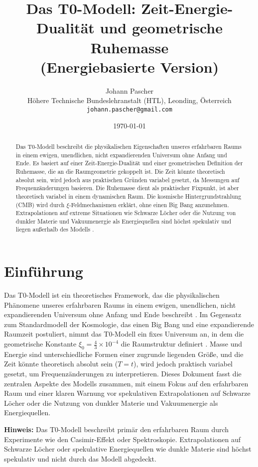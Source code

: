 \documentclass[12pt,a4paper]{article}
\title{Das T0-Modell: Zeit-Energie-Dualität und geometrische Ruhemasse\\
	\large (Energiebasierte Version)}
\author{Johann Pascher\\
	\small Höhere Technische Bundeslehranstalt (HTL), Leonding, Österreich\\
	\small \texttt{johann.pascher@gmail.com}}
\date{\today}
\begin{document}
	
	\maketitle
	\tableofcontents
	\newpage
	
	\begin{abstract}
		Das T0-Modell beschreibt die physikalischen Eigenschaften unseres erfahrbaren Raums in einem ewigen, unendlichen, nicht expandierenden Universum ohne Anfang und Ende. Es basiert auf einer Zeit-Energie-Dualität und einer geometrischen Definition der Ruhemasse, die an die Raumgeometrie gekoppelt ist. Die Zeit könnte theoretisch absolut sein, wird jedoch aus praktischen Gründen variabel gesetzt, da Messungen auf Frequenzänderungen basieren. Die Ruhemasse dient als praktischer Fixpunkt, ist aber theoretisch variabel in einem dynamischen Raum. Die kosmische Hintergrundstrahlung (CMB) wird durch \(\xi\)-Feldmechanismen erklärt, ohne einen Big Bang anzunehmen. Extrapolationen auf extreme Situationen wie Schwarze Löcher oder die Nutzung von dunkler Materie und Vakuumenergie als Energiequellen sind höchst spekulativ und liegen außerhalb des Modells \cite{pascher_t0_energie_2025}.
	\end{abstract}
	
	\section{Einführung}
	Das T0-Modell ist ein theoretisches Framework, das die physikalischen Phänomene unseres erfahrbaren Raums in einem ewigen, unendlichen, nicht expandierenden Universum ohne Anfang und Ende beschreibt \cite{pascher_t0_energie_2025}. Im Gegensatz zum Standardmodell der Kosmologie, das einen Big Bang und eine expandierende Raumzeit postuliert, nimmt das T0-Modell ein fixes Universum an, in dem die geometrische Konstante \(\xi_0 = \frac{4}{3} \times 10^{-4}\) die Raumstruktur definiert \cite{Casimir1948}. Masse und Energie sind unterschiedliche Formen einer zugrunde liegenden Größe, und die Zeit könnte theoretisch absolut sein (\( T = t \)), wird jedoch praktisch variabel gesetzt, um Frequenzänderungen zu interpretieren. Dieses Dokument fasst die zentralen Aspekte des Modells zusammen, mit einem Fokus auf den erfahrbaren Raum und einer klaren Warnung vor spekulativen Extrapolationen auf Schwarze Löcher oder die Nutzung von dunkler Materie und Vakuumenergie als Energiequellen.
	
	\textbf{Hinweis:} Das T0-Modell beschreibt primär den erfahrbaren Raum durch Experimente wie den Casimir-Effekt oder Spektroskopie. Extrapolationen auf Schwarze Löcher oder spekulative Energiequellen wie dunkle Materie sind höchst spekulativ und nicht durch das Modell abgedeckt.
	
\end{document}

